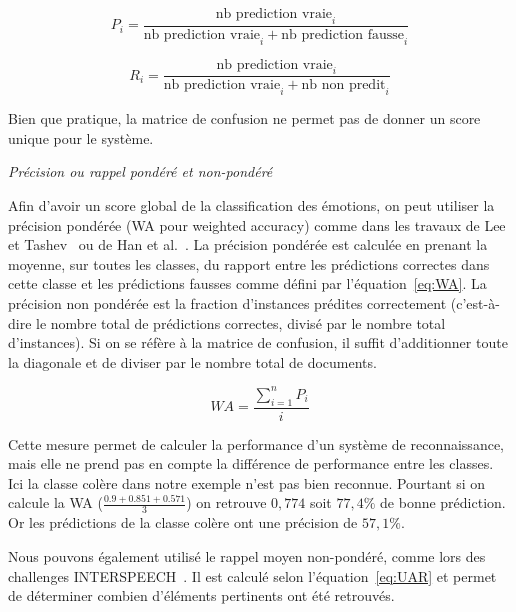 \begin{equation}
  P_i = \frac{\text{nb prediction vraie}_i}{\text{nb prediction vraie}_i + \text{nb prediction fausse}_i}
  \label{eq:precision}
\end{equation}

\begin{equation}
  R_i = \frac{\text{nb prediction vraie}_i}{\text{nb prediction vraie}_i + \text{nb non predit}_i}
  \label{eq:rappel}
\end{equation}

Bien que pratique, la matrice de confusion ne permet pas de donner un score unique pour le système.


\vspace{1cm}
\textit{Précision ou rappel pondéré et non-pondéré}

Afin d'avoir un score global de la classification des émotions, on peut utiliser la précision pondérée (WA pour weighted accuracy) comme dans les travaux de Lee et Tashev~\cite{Lee2015} ou de Han et al.~\cite{Han2014}. La précision pondérée est calculée en prenant la moyenne, sur toutes les classes, du rapport entre les prédictions correctes dans cette classe et les prédictions fausses comme défini par l'équation~\ref{eq:WA}. La précision non pondérée est la fraction d'instances prédites correctement (c'est-à-dire le nombre total de prédictions correctes, divisé par le nombre total d'instances). Si on se réfère à la matrice de confusion, il suffit d'additionner toute la diagonale et de diviser par le nombre total de documents.

\begin{equation}
  WA = \frac{\sum^n_{i=1}{P_i}}{i}
  \label{eq:WA}
\end{equation}

Cette mesure permet de calculer la performance d'un système de reconnaissance, mais elle ne prend pas en compte la différence de performance entre les classes. Ici la classe colère dans notre exemple n'est pas bien reconnue. Pourtant si on calcule la WA ($\frac{0.9+0.851+0.571}{3}$) on retrouve $0,774$ soit $77,4\%$ de bonne prédiction. Or les prédictions de la classe colère ont une précision de $57,1\%$.

Nous pouvons également utilisé le rappel moyen non-pondéré, comme lors des challenges INTERSPEECH~\cite{Schuller2009,Schuller2011}. Il est calculé selon l'équation~\ref{eq:UAR} et permet de déterminer combien d'éléments pertinents ont été retrouvés.

